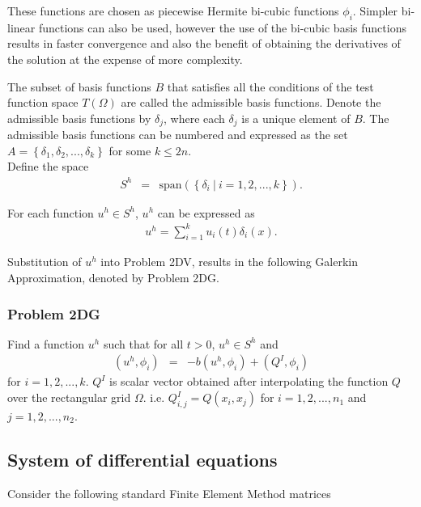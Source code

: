 These functions are chosen as piecewise Hermite bi-cubic functions $\phi_i$. Simpler bi-linear functions can also be used, however the use of the bi-cubic basis functions results in faster convergence and also the benefit of obtaining the derivatives of the solution at the expense of more complexity.

The subset of basis functions $B$ that satisfies all the conditions of the test function space $T(\Omega)$ are called the admissible basis functions. Denote the admissible basis functions by $\delta_j$, where each $\delta_j$ is a unique element of $B$. The admissible basis functions can be numbered and expressed as the set $A = \left \{\delta_1, \delta_2,..., \delta_k \right\}$ for some $k \leq 2n$.\\ 

Define the space
\begin{eqnarray*}
S^h & = & \textrm{span}\left(\left\{\delta_i \ | \ i = 1,2,...,k \right\} \right).
\end{eqnarray*}

For each function $u^h \in S^h$, $u^h$ can be expressed as
\begin{eqnarray*}
	u^h = \sum_{i = 1}^{k} u_i(t) \delta_{i}(x).
\end{eqnarray*}

Substitution of $u^h$ into Problem 2DV, results in the following Galerkin Approximation, denoted by Problem 2DG.

\subsubsection{Problem 2DG}
Find a function $u^h$ such that for all $t>0$, $u^h \in S^h$ and
\begin{eqnarray*}
	(u^h, \phi_i) & = & -b(u^h,\phi_i) + (Q^I, \phi_i)
\end{eqnarray*} for $i = 1,2,...,k$. $Q^I$ is scalar vector obtained after interpolating the function $Q$ over the rectangular grid $\Omega$. i.e. $Q^I_{i,j} = Q(x_i,x_j)$ for $i = 1,2,...,n_1$ and $j = 1,2,...,n_2$.

\subsection{System of differential equations}\label{ssec:2DFEM:DE}

Consider the following standard Finite Element Method matrices
